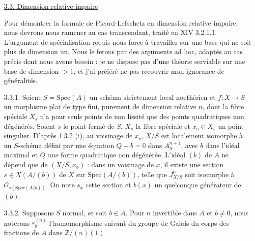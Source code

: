 \underline{3.3. Dimension relative impaire}

Pour démontrer la formule de Picard-Lefschetz en dimension relative impaire, nous devrons nous ramener au cas transcendant, traité en XIV 3.2.1.1. L'argument de spécialisation requis nous force à travailler sur une base qui ne soit plus de dimension un. Nous le ferons par des arguments ad hoc, adaptés au cas précis dont nous avons besoin : je ne dispose pas d'une théorie serviable sur une base de dimension $>1$, et j'ai préféré ne pas recouvrir mon ignorance de généralités.

3.3.1. Soient $S=\mathrm{Spec}(A)$ un schéma strictement local noethérien et $f:X\to S$ un morphisme plat de type fini, purement de dimension relative $n$, dont la fibre spéciale $X_s$ n'a pour seuls points de non lissité que des points quadratiques non dégénérés. Soient $s$ le point fermé de $S$, $X_s$ la fibre spéciale et $x_o\in X_s$ un point singulier. D'après 1.3.2 (i), au voisinage de $x_o$, $X/S$ est localement isomorphe à un $S$-schéma défini par une équation $Q-b=0$ dans $A^{n+1}_S$, avec $b$ dans l'idéal maximal et $Q$ une forme quadratique non dégénérée. L'idéal $(b)$ de $A$ ne dépend que de $(X/S,x_o)$ : dans un voisinage de $x$, il existe une section $s\in X(A/(b))$ de $X$ sur $\mathrm{Spec}(A/(b))$, telle que $J^n_{X/S}$ soit isomorphe à $\mathcal{O}_{s(\mathrm{Spec}(A/b))}$. On note $s_x$ cette section et $b(x)$ un quelconque générateur de $(b)$.



%
%
3.3.2. Supposons $S$ normal, et soit $b\in A$. Pour $n$ invertible dans $A$ et $b\neq 0$, nous noterons $\varepsilon_b^{(n)}$ l'homomorphisme suivant du groupe de Galois du corps des fractions de $A$ dans $\mathbb{Z}/(n)(1)$


